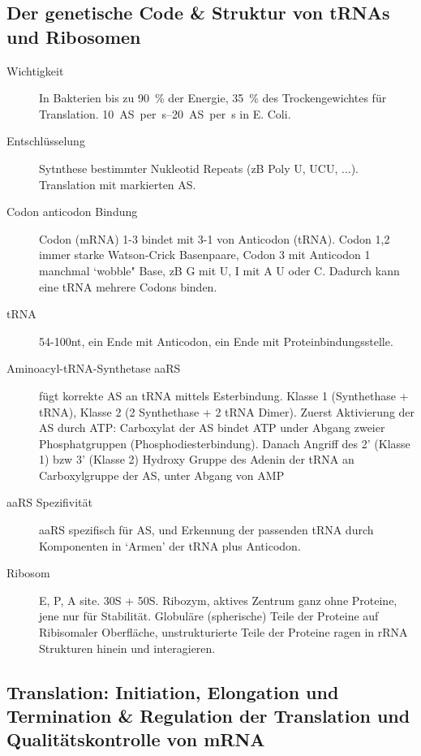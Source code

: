 \documentclass[a4paper,twocolumn,usegeometry,english,fontsize=5,DIV=24]{scrartcl}
\begin{document}
\subsection{Der genetische Code \& Struktur von tRNAs und Ribosomen}

\begin{description}
	\item[Wichtigkeit] In Bakterien bis zu \SI{90}{\percent} der Energie,
		\SI{35}{\percent} des Trockengewichtes für Translation.
		\SIrange{10}{20}{AS per s} in E. Coli.
	\item[Entschlüsselung] Sytnthese bestimmter Nukleotid Repeats (zB Poly
		U, UCU, ...).  Translation mit markierten AS.
	\item[Codon anticodon Bindung] Codon (mRNA) 1-3 bindet mit 3-1 von
		Anticodon (tRNA). Codon 1,2 immer starke Watson-Crick
		Basenpaare, Codon 3 mit Anticodon 1 manchmal `wobble" Base, zB
		G mit U, I mit A U oder C. Dadurch kann eine tRNA mehrere
		Codons binden.
	\item[tRNA] 54-100nt, ein Ende mit Anticodon, ein Ende mit
		Proteinbindungsstelle.
	\item[Aminoacyl-tRNA-Synthetase aaRS] fügt korrekte AS an tRNA mittels
		Esterbindung. Klasse 1 (Synthethase + tRNA), Klasse 2 (2
		Synthethase + 2 tRNA Dimer). Zuerst Aktivierung der AS durch
		ATP: Carboxylat der AS bindet ATP under Abgang zweier
		Phosphatgruppen (Phosphodiesterbindung). Danach Angriff des 2'
		(Klasse 1) bzw 3' (Klasse 2) Hydroxy Gruppe des Adenin der tRNA
		an Carboxylgruppe der AS, unter Abgang von AMP
	\item[aaRS Spezifivität] aaRS spezifisch für AS, und Erkennung der
		passenden tRNA durch Komponenten in `Armen' der tRNA plus
		Anticodon.
	\item[Ribosom] E, P, A site. 30S + 50S. Ribozym, aktives Zentrum ganz
		ohne Proteine, jene nur für Stabilität. Globuläre (spherische)
		Teile der Proteine auf Ribisomaler Oberfläche, unstrukturierte
		Teile der Proteine ragen in rRNA Strukturen hinein und
		interagieren.
\end{description}

\subsection{Translation: Initiation, Elongation und Termination \& Regulation
der Translation und Qualitätskontrolle von mRNA}
\end{document}
